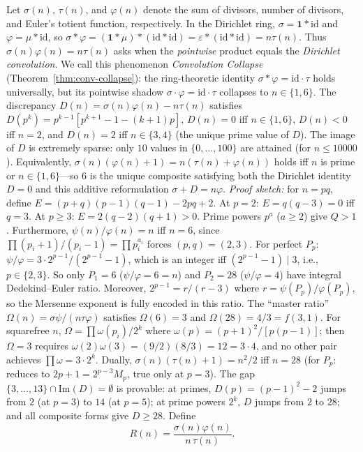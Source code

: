 \documentclass[11pt]{amsart}
\theoremstyle{remark}
\begin{document}
Let $\sigma(n)$, $\tau(n)$, and $\varphi(n)$ denote the sum of divisors,
number of divisors, and Euler's totient function, respectively.
In the Dirichlet ring, $\sigma = \mathbf{1} * \mathrm{id}$ and
$\varphi = \mu * \mathrm{id}$, so
$\sigma * \varphi = (\mathbf{1} * \mu) * (\mathrm{id} * \mathrm{id})
= \varepsilon * (\mathrm{id} * \mathrm{id}) = n\tau(n)$.
Thus $\sigma(n)\varphi(n) = n\tau(n)$ asks when the
\emph{pointwise} product equals the \emph{Dirichlet convolution}.
We call this phenomenon \emph{Convolution Collapse}
(Theorem~\ref{thm:conv-collapse}): the ring-theoretic identity
$\sigma * \varphi = \mathrm{id} \cdot \tau$ holds universally,
but its pointwise shadow $\sigma \cdot \varphi = \mathrm{id} \cdot \tau$
collapses to $n \in \{1, 6\}$.
The discrepancy $D(n) = \sigma(n)\varphi(n) - n\tau(n)$ satisfies
$D(p^k) = p^{k-1}[p^{k+1} - 1 - (k+1)p]$,
$D(n) = 0$ iff $n \in \{1,6\}$, $D(n) < 0$ iff $n = 2$, and
$D(n) = 2$ iff $n \in \{3, 4\}$ (the unique prime value of $D$).
The image of $D$ is extremely sparse: only $10$ values in $\{0,\ldots,100\}$
are attained (for $n \leq 10000$).
Equivalently, $\sigma(n)(\varphi(n)+1) = n(\tau(n)+\varphi(n))$
holds iff $n$ is prime or $n \in \{1,6\}$---so $6$ is the unique
composite satisfying both the Dirichlet identity $D = 0$
and this additive reformulation $\sigma + D = n\varphi$.
\emph{Proof sketch:} for $n = pq$, define
$E = (p+q)(p-1)(q-1) - 2pq + 2$.
At $p = 2$: $E = q(q-3) = 0$ iff $q = 3$.
At $p \geq 3$: $E = 2(q-2)(q+1) > 0$.
Prime powers $p^a$ ($a \geq 2$) give $Q > 1$.
Furthermore, $\psi(n)/\varphi(n) = n$ iff $n = 6$,
since $\prod (p_i+1)/(p_i-1) = \prod p_i^{a_i}$ forces $(p,q)=(2,3)$.
For perfect $P_p$: $\psi/\varphi = 3 \cdot 2^{p-1}/(2^{p-1}-1)$,
which is an integer iff $(2^{p-1}-1) \mid 3$, i.e., $p \in \{2,3\}$.
So only $P_1 = 6$ ($\psi/\varphi = 6 = n$) and $P_2 = 28$
($\psi/\varphi = 4$) have integral Dedekind--Euler ratio.
Moreover, $2^{p-1} = r/(r-3)$ where $r = \psi(P_p)/\varphi(P_p)$,
so the Mersenne exponent is fully encoded in this ratio.
The ``master ratio'' $\Omega(n) = \sigma\psi/(n\tau\varphi)$ satisfies
$\Omega(6) = 3$ and $\Omega(28) = 4/3 = f(3,1)$.
For squarefree $n$, $\Omega = \prod \omega(p_i) / 2^k$ where
$\omega(p) = (p+1)^2/[p(p-1)]$; then $\Omega = 3$ requires
$\omega(2)\omega(3) = (9/2)(8/3) = 12 = 3 \cdot 4$,
and no other pair achieves $\prod \omega = 3 \cdot 2^k$.
Dually, $\sigma(n)(\tau(n)+1) = n^2/2$ iff $n = 28$
(for $P_p$: reduces to $2p+1 = 2^{p-3} M_p$, true only at $p=3$).
The gap $\{3,\ldots,13\} \cap \mathrm{Im}(D) = \emptyset$ is provable:
at primes, $D(p) = (p-1)^2 - 2$ jumps from $2$ (at $p=3$) to $14$ (at $p=5$);
at prime powers $2^k$, $D$ jumps from $2$ to $28$;
and all composite forms give $D \geq 28$.
Define
\[
  R(n) = \frac{\sigma(n)\varphi(n)}{n\,\tau(n)}.
\]
\end{document}
